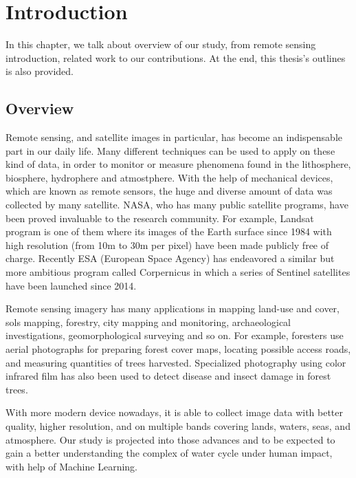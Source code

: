\chapter{Introduction}
\label{chap-1-intro}
\begin{ChapAbstract}
In this chapter, we talk about overview of our study, from remote sensing introduction, related work to our contributions. At the end, this thesis's outlines is also provided.

\end{ChapAbstract}


\section{Overview} 

\iffalse 
Remote sensing, and satellite images in particular, has become an indispensable part in our daily life. Many different techniques can be used to apply on these kind of data, in order to monitor or measure phenomena found in the lithosphere, biosphere, hydrophere and atmostphere. With the help of mechanical devices, which are known as remote sensors, the huge and diverse amount of data was collected by many satellite. NASA, who has many public satellite programs, have been proved invaluable to the research community. For example, Landsat program is one of them where its images of the Earth surface since 1984 with high resolution (from 10m to 30m per pixel) have been made publicly  free of charge. Recently ESA (European Space Agency) has endeavored a similar but more ambitious program called Corpernicus in which a series of Sentinel satellites have been launched since 2014.

Remote sensing imagery has many applications in mapping land-use and cover, sols mapping, forestry, city mapping and monitoring, archaeological investigations, geomorphological surveying and so on. For example, foresters use aerial photographs for preparing forest cover maps, locating possible access roads, and measuring quantities of trees harvested. Specialized photography using color infrared film has also been used to detect disease and insect damage in forest trees. 

With more modern device nowadays, it is able to collect image data with better quality, higher resolution, and on multiple bands covering lands, waters, seas, and atmosphere. Our study is projected into those advances and to be expected to gain a better understanding the complex of water cycle under human impact, with help of Machine Learning.


